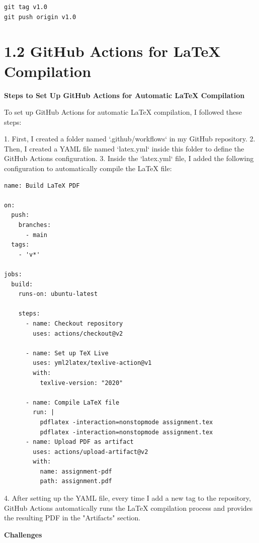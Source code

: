 \documentclass{article}
\begin{document}
\begin{verbatim}
git tag v1.0
git push origin v1.0
\end{verbatim}















\section*{1.2 GitHub Actions for LaTeX Compilation}

\textbf{Steps to Set Up GitHub Actions for Automatic LaTeX Compilation}

To set up GitHub Actions for automatic LaTeX compilation, I followed these steps:

1. First, I created a folder named `.github/workflows` in my GitHub repository.
2. Then, I created a YAML file named `latex.yml` inside this folder to define the GitHub Actions configuration.
3. Inside the `latex.yml` file, I added the following configuration to automatically compile the LaTeX file:

\begin{verbatim}
name: Build LaTeX PDF

on:
  push:
    branches:
      - main
  tags:
    - 'v*'

jobs:
  build:
    runs-on: ubuntu-latest

    steps:
      - name: Checkout repository
        uses: actions/checkout@v2

      - name: Set up TeX Live
        uses: yml2latex/texlive-action@v1
        with:
          texlive-version: "2020"

      - name: Compile LaTeX file
        run: |
          pdflatex -interaction=nonstopmode assignment.tex
          pdflatex -interaction=nonstopmode assignment.tex
      - name: Upload PDF as artifact
        uses: actions/upload-artifact@v2
        with:
          name: assignment-pdf
          path: assignment.pdf
\end{verbatim}

4. After setting up the YAML file, every time I add a new tag to the repository, GitHub Actions automatically runs the LaTeX compilation process and provides the resulting PDF in the "Artifacts" section.

\textbf{Challenges}
\end{document}
